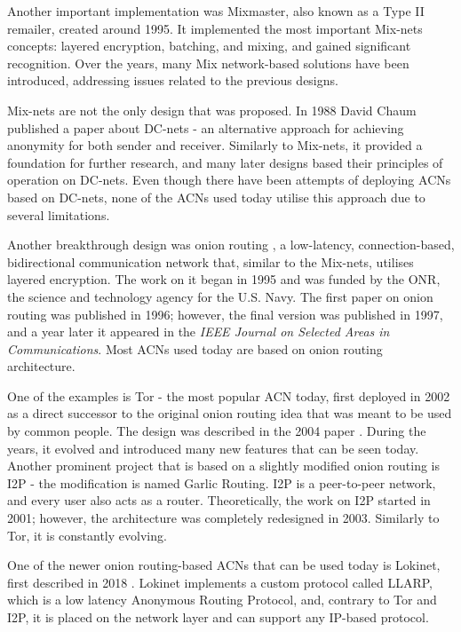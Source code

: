 Another important implementation was Mixmaster, also known as a Type II remailer, created around 1995. It implemented the most important Mix-nets concepts: layered encryption, batching, and mixing, and gained significant recognition. Over the years, many Mix network-based solutions have been introduced, addressing issues related to the previous designs.

Mix-nets are not the only design that was proposed. In 1988 David Chaum published a paper about DC-nets \cite{dc-nets} - an alternative approach for achieving anonymity for both sender and receiver. Similarly to Mix-nets, it provided a foundation for further research, and many later designs based their principles of operation on DC-nets. Even though there have been attempts of deploying ACNs based on DC-nets, none of the ACNs used today utilise this approach due to several limitations.

Another breakthrough design was onion routing \cite{onion-routing98, onion-routing-internet99}, a low-latency, connection-based, bidirectional communication network that, similar to the Mix-nets, utilises layered encryption. The work on it began in 1995 and was funded by the ONR, the science and technology agency for the U.S. Navy. The first paper on onion routing was published in 1996; however, the final version was published in 1997, and a year later it appeared in the \textit{IEEE Journal on Selected Areas in Communications}. Most ACNs used today are based on onion routing architecture.

One of the examples is Tor - the most popular ACN today, first deployed in 2002 as a direct successor to the original onion routing idea that was meant to be used by common people. The design was described in the 2004 paper \cite{tor-design}. During the years, it evolved and introduced many new features that can be seen today.
Another prominent project that is based on a slightly modified onion routing is I2P - the modification is named Garlic Routing. I2P is a peer-to-peer network, and every user also acts as a router. Theoretically, the work on I2P started in 2001; however, the architecture was completely redesigned in 2003. Similarly to Tor, it is constantly evolving.

One of the newer onion routing-based ACNs that can be used today is Lokinet, first described in 2018 \cite{loki}. Lokinet implements a custom protocol called LLARP, which is a low latency Anonymous Routing Protocol, and, contrary to Tor and I2P, it is placed on the network layer and can support any IP-based protocol.

